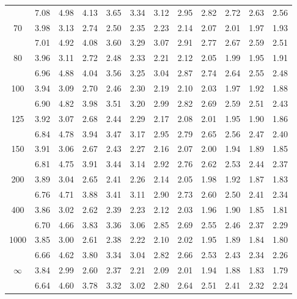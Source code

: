 \documentclass[lang=cn,10pt]{elegantbook}
\begin{document}
\begin{longtable}{c|ccccccccccc}
       & 7.08 & 4.98 & 4.13 & 3.65 & 3.34 & 3.12 & 2.95 & 2.82 & 2.72 & 2.63 & 2.56 \\
    70 & 3.98 & 3.13 & 2.74 & 2.50 & 2.35 & 2.23 & 2.14 & 2.07 & 2.01 & 1.97 & 1.93 \\
       & 7.01 & 4.92 & 4.08 & 3.60 & 3.29 & 3.07 & 2.91 & 2.77 & 2.67 & 2.59 & 2.51 \\
    80 & 3.96 & 3.11 & 2.72 & 2.48 & 2.33 & 2.21 & 2.12 & 2.05 & 1.99 & 1.95 & 1.91 \\
       & 6.96 & 4.88 & 4.04 & 3.56 & 3.25 & 3.04 & 2.87 & 2.74 & 2.64 & 2.55 & 2.48 \\
    100& 3.94 & 3.09 & 2.70 & 2.46 & 2.30 & 2.19 & 2.10 & 2.03 & 1.97 & 1.92 & 1.88 \\
       & 6.90 & 4.82 & 3.98 & 3.51 & 3.20 & 2.99 & 2.82 & 2.69 & 2.59 & 2.51 & 2.43 \\
    125& 3.92 & 3.07 & 2.68 & 2.44 & 2.29 & 2.17 & 2.08 & 2.01 & 1.95 & 1.90 & 1.86 \\
       & 6.84 & 4.78 & 3.94 & 3.47 & 3.17 & 2.95 & 2.79 & 2.65 & 2.56 & 2.47 & 2.40 \\
    150& 3.91 & 3.06 & 2.67 & 2.43 & 2.27 & 2.16 & 2.07 & 2.00 & 1.94 & 1.89 & 1.85 \\
       & 6.81 & 4.75 & 3.91 & 3.44 & 3.14 & 2.92 & 2.76 & 2.62 & 2.53 & 2.44 & 2.37 \\
    200& 3.89 & 3.04 & 2.65 & 2.41 & 2.26 & 2.14 & 2.05 & 1.98 & 1.92 & 1.87 & 1.83 \\
       & 6.76 & 4.71 & 3.88 & 3.41 & 3.11 & 2.90 & 2.73 & 2.60 & 2.50 & 2.41 & 2.34 \\
    400& 3.86 & 3.02 & 2.62 & 2.39 & 2.23 & 2.12 & 2.03 & 1.96 & 1.90 & 1.85 & 1.81 \\
       & 6.70 & 4.66 & 3.83 & 3.36 & 3.06 & 2.85 & 2.69 & 2.55 & 2.46 & 2.37 & 2.29 \\
    1000&3.85 & 3.00 & 2.61 & 2.38 & 2.22 & 2.10 & 2.02 & 1.95 & 1.89 & 1.84 & 1.80 \\
       & 6.66 & 4.62 & 3.80 & 3.34 & 3.04 & 2.82 & 2.66 & 2.53 & 2.43 & 2.34 & 2.26 \\
    $\infty$&3.84&2.99&2.60&2.37&2.21&2.09&2.01&1.94&1.88&1.83&1.79 \\
       & 6.64 & 4.60 & 3.78 & 3.32 & 3.02 & 2.80 & 2.64 & 2.51 & 2.41 & 2.32 & 2.24 \\
    \hline
\end{longtable}
\end{document}
